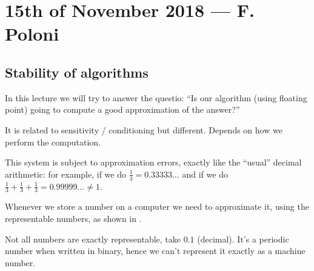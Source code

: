 \documentclass[computational_mathematics.tex]{subfiles}
\begin{document}
\section{15th of November 2018 --- F. Poloni}

\subsection{Stability of algorithms}

In this lecture we will try to answer the questio: ``Is our algorithm (using floating point) going to compute a good approximation of the answer?''

It is related to sensitivity / conditioning but different. Depends on how we perform the computation.


This system is subject to approximation errors, exactly like the ``usual'' decimal arithmetic: for example, if we do $\frac{1}{3} = 0.33333 \ldots$ and if we do $\frac{1}{3} + \frac{1}{3} + \frac{1}{3} = 0.99999 \ldots \neq 1$. 

Whenever we store a number on a computer we need to approximate it, using the representable numbers, as shown in .


Not all numbers are exactly representable, take $0.1$ (decimal). It's a periodic number when written in binary, hence we can't represent it exactly as a machine number.
\end{document}

